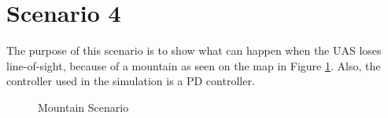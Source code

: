 \section{Scenario 4}\label{sec:scenario4}
The purpose of this scenario is to show what can happen when the UAS loses line-of-sight, because of a mountain as seen on the map in Figure \ref{fig:s4_map}. Also, the controller used in the simulation is a PD controller.

\begin{figure}[H]
\hfill
{}
\hfill
{}
\hfill
\caption{Mountain Scenario}
\label{fig:s4_map}
\end{figure}